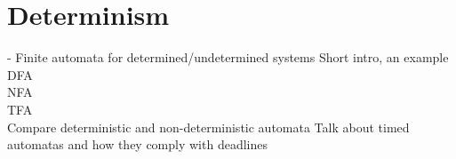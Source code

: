 \section{Determinism} \label{sc:determinism}

- Finite automata for determined/undetermined systems
Short intro, an example\\
DFA\\
NFA\\
TFA\\
Compare deterministic and non-deterministic automata
Talk about timed automatas and how they comply with deadlines